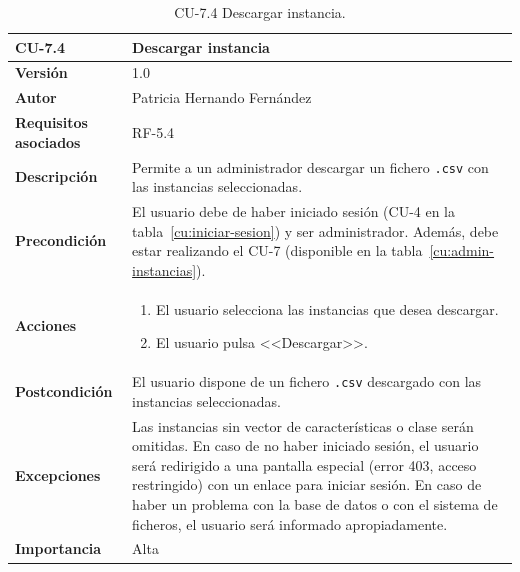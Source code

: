 \begin{table}[p]
	\centering
	\begin{tabularx}{\linewidth}{ p{} p{} }
		\toprule
		\textbf{CU-7.4}    & \textbf{Descargar instancia}\\
		\toprule
		\textbf{Versión}              & 1.0    \\
		\textbf{Autor}                & Patricia Hernando Fernández \\
		\textbf{Requisitos asociados} & RF-5.4 \\
		\textbf{Descripción}          & Permite a un administrador descargar un fichero \texttt{.csv} con las instancias seleccionadas.\\
		\textbf{Precondición}         & El usuario debe de haber iniciado sesión (CU-4 en la tabla~\ref{cu:iniciar-sesion}) y ser administrador. Además, debe estar realizando el CU-7 (disponible en la tabla~\ref{cu:admin-instancias}). \\
		\textbf{Acciones}             &
		\begin{enumerate}
			\def\labelenumi{\arabic{enumi}.}
			\tightlist
			\item El usuario selecciona las instancias que desea descargar.
			\item El usuario pulsa <<Descargar>>.
		\end{enumerate}\\
		\textbf{Postcondición}        & El usuario dispone de un fichero \texttt{.csv} descargado con las instancias seleccionadas.\\
		\textbf{Excepciones}          & Las instancias sin vector de características o clase serán omitidas. En caso de no haber iniciado sesión, el usuario será redirigido a una pantalla especial (error 403, acceso restringido) con un enlace para iniciar sesión. En caso de haber un problema con la base de datos o con el sistema de ficheros, el usuario será informado apropiadamente.\\
		\textbf{Importancia}          & Alta \\
		\bottomrule
	\end{tabularx}
	\caption{CU-7.4 Descargar instancia.}
	\label{cu:descargar-instancia}
\end{table}


